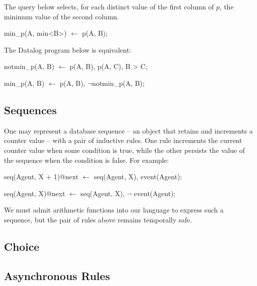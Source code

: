\begin{example}
The query below selects, for each distinct value of the first column of $p$, the minimum 
value of the second column.

\begin{Dedalus}
min_p(A, min<B>) \(\leftarrow\) p(A, B);
\end{Dedalus}

The Datalog program below is equivalent:

\begin{Dedalus}
notmin_p(A, B) \(\leftarrow\) p(A, B), p(A, C), B > C;
  
min_p(A, B) \(\leftarrow\) p(A, B), \(\lnot\)notmin_p(A, B);
\end{Dedalus}
\end{example}


\subsection{Sequences}

One may represent a database sequence -- an object that retains and increments a counter value -- with a pair of inductive rules.  One rule increments the current counter value when some condition is true, while the other persists the value of the sequence when the condition is false.  For example:

\begin{Dedalus}
seq(Agent, X + 1)@next \(\leftarrow\) seq(Agent, X), event(Agent);
  
seq(Agent, X)@next \(\leftarrow\) seq(Agent, X), \(\lnot\) event(Agent);
\end{Dedalus}

We must admit arithmetic functions into our language to express such a
sequence, but the pair of rules above remains temporally safe.







\subsection{Choice}


\subsection{Asynchronous Rules}

